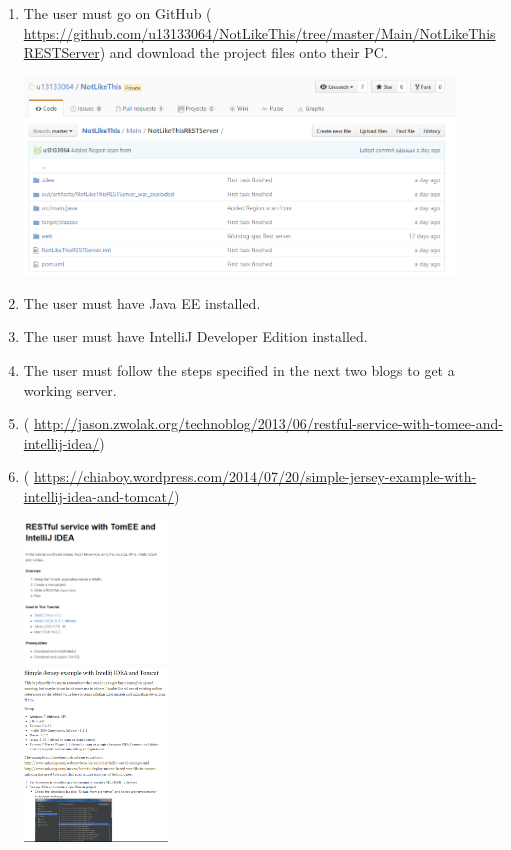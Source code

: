 \documentclass[hidelinks,a4paper,12pt]{article}
\begin{document}
\begin {enumerate}
	\item The user must go on GitHub ( \url {https://github.com/u13133064/NotLikeThis/tree/master/Main/NotLikeThisRESTServer}) and download the project files onto their PC.
	\begin{center}
  		 \includegraphics[width=0.9\textwidth] {./images/Github.png}\\[0.4cm]
	\end{center}
	
	\item The user must have Java EE installed.
	\item The user must have IntelliJ Developer Edition installed.
	\item The user must follow the steps specified in the next two blogs to get a working server.
	\item ( \url {http://jason.zwolak.org/technoblog/2013/06/restful-service-with-tomee-and-intellij-idea/})
	\item ( \url {https://chiaboy.wordpress.com/2014/07/20/simple-jersey-example-with-intellij-idea-and-tomcat/})
		\begin{center}
			\includegraphics[width=0.3\textwidth] {./images/InstallOne.png}\\[0.4cm]
	
					\includegraphics[width=0.3\textwidth] {./images/InstallTwo.png}\\[0.4cm]
				\end{center}

	
	
	
\end{enumerate}
\end{document}

